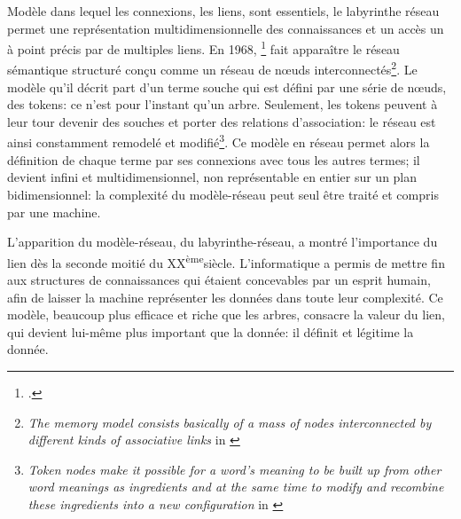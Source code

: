 Modèle dans lequel les connexions, les liens, sont essentiels, le labyrinthe réseau permet une représentation multidimensionnelle des connaissances et un accès un à point précis par de multiples liens. En 1968, \footcite[p.227-270]{minsky_semantic_1968} fait apparaître le réseau sémantique structuré conçu comme un réseau de nœuds interconnectés\footnote{\og \textit{The memory model consists basically of a mass of nodes interconnected by different kinds of associative links}\fg{} in \cite[p.234]{minsky_semantic_1968}}. Le modèle qu'il décrit part d'un terme souche qui est défini par une série de nœuds, des tokens: ce n'est pour l'instant qu'un arbre. Seulement, les tokens peuvent à leur tour devenir des souches et porter des relations d'association: le réseau est ainsi constamment remodelé et modifié\footnote{\og \textit{Token nodes make it possible for a word's meaning to be built up from other word meanings as ingredients and at the same time to modify and recombine these ingredients into a new configuration}\fg{} in \cite[p.234]{minsky_semantic_1968}}. Ce modèle en réseau permet alors la définition de chaque terme par ses connexions avec tous les autres termes; il devient infini et multidimensionnel, non représentable en entier sur un plan bidimensionnel: la complexité du modèle-réseau peut seul être traité et compris par une machine. 

\bigskip
\bigskip
L'apparition du modèle-réseau, du labyrinthe-réseau, a montré l'importance du lien dès la seconde moitié du \textsc{XX}\textsuperscript{ème}siècle. L'informatique a permis de mettre fin aux structures de connaissances qui étaient concevables par un esprit humain, afin de laisser la machine représenter les données dans toute leur complexité. Ce modèle, beaucoup plus efficace et riche que les arbres, consacre la valeur du lien, qui devient lui-même plus important que la donnée: il définit et légitime la donnée.
